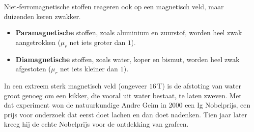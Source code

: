 \documentclass{ximera}
\begin{document}
\begin{remark}[expandable=true,title={Extra: para- en diamagnetisme}]\nl
    Niet-ferromagnetische stoffen reageren ook op een magnetisch veld, maar duizenden keren zwakker.
    \begin{itemize}
        \item \textbf{Paramagnetische} stoffen, zoals aluminium en zuurstof, worden heel zwak aangetrokken ($\mu_r$ net iets groter dan $1$).
        \item \textbf{Diamagnetische} stoffen, zoals water, koper en bismut, worden heel zwak afgestoten ($\mu_r$ net iets kleiner dan $1$).
    \end{itemize}
    In een extreem sterk magnetisch veld (ongeveer $16\,\mathrm{T}$) is de afstoting van water groot genoeg om een kikker, die vooral uit water bestaat, te laten zweven. Met dat experiment won de natuurkundige Andre Geim in 2000 een Ig Nobelprijs, een prijs voor onderzoek dat eerst doet lachen en dan doet nadenken. Tien jaar later kreeg hij de echte Nobelprijs voor de ontdekking van grafeen.
\end{remark}
\end{document}
